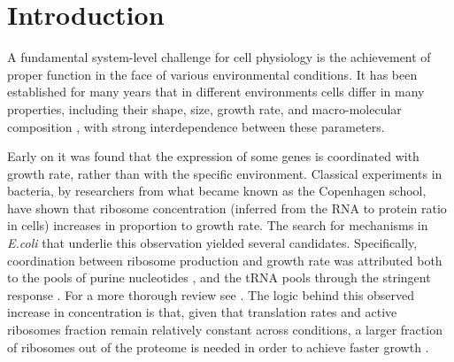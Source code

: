 \section{Introduction}
A fundamental system-level challenge for cell physiology is the achievement of proper function in the face of various environmental conditions.
It has been established for many years that in different environments cells differ in many properties, including their shape, size, growth rate, and macro-molecular composition \cite{Schaechter1958,Maaloe1969,Churchward1982,Pedersen1978a,ingraham1983growth,Bremer1987}, with strong interdependence between these parameters.


Early on it was found that the expression of some genes is coordinated with growth rate, rather than with the specific environment.
Classical experiments in bacteria, by researchers from what became known as the Copenhagen school, have shown that ribosome concentration (inferred from the RNA to protein ratio in cells) increases in proportion to growth rate\cite{Schaechter1958}.
The search for mechanisms in \emph{E.coli} that underlie this observation yielded several candidates.
Specifically, coordination between ribosome production and growth rate was attributed both to the pools of purine nucleotides \cite{Gourse1996,Gaal1997}, and the tRNA pools through the stringent response \cite{Chatterji2001,Brauer2008a}.
For a more thorough review see \cite{Nomura1984}.
The logic behind this observed increase in concentration is that, given that translation rates and active ribosomes fraction remain relatively constant across conditions, a larger fraction of ribosomes out of the proteome is needed in order to achieve faster growth \cite{Neidhardt1999,Dennis2004,Zaslaver2009}.


